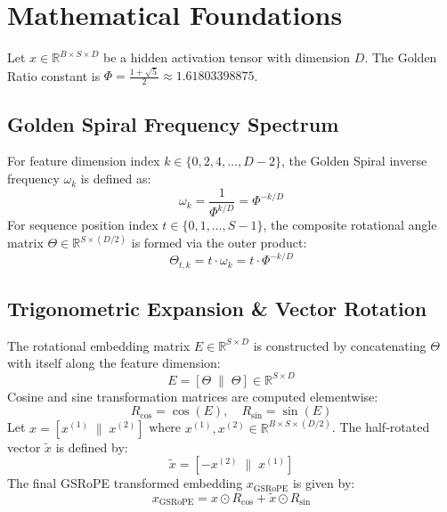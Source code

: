 \section{Mathematical Foundations}
Let $x \in \mathbb{R}^{B \times S \times D}$ be a hidden activation tensor with dimension $D$. The Golden Ratio constant is $\Phi = \frac{1+\sqrt{5}}{2} \approx 1.61803398875$.

\subsection{Golden Spiral Frequency Spectrum}
For feature dimension index $k \in \{0, 2, 4, \dots, D-2\}$, the Golden Spiral inverse frequency $\omega_k$ is defined as:
\begin{equation}
    \omega_k = \frac{1}{\Phi^{k / D}} = \Phi^{-k / D}
\end{equation}
For sequence position index $t \in \{0, 1, \dots, S-1\}$, the composite rotational angle matrix $\Theta \in \mathbb{R}^{S \times (D/2)}$ is formed via the outer product:
\begin{equation}
    \Theta_{t, k} = t \cdot \omega_k = t \cdot \Phi^{-k / D}
\end{equation}

\subsection{Trigonometric Expansion \& Vector Rotation}
The rotational embedding matrix $E \in \mathbb{R}^{S \times D}$ is constructed by concatenating $\Theta$ with itself along the feature dimension:
\begin{equation}
    E = [\Theta \;\|\; \Theta] \in \mathbb{R}^{S \times D}
\end{equation}
Cosine and sine transformation matrices are computed elementwise:
\begin{equation}
    R_{\text{cos}} = \cos(E), \quad R_{\text{sin}} = \sin(E)
\end{equation}
Let $x = [x^{(1)} \;\|\; x^{(2)}]$ where $x^{(1)}, x^{(2)} \in \mathbb{R}^{B \times S \times (D/2)}$. The half-rotated vector $\tilde{x}$ is defined by:
\begin{equation}
    \tilde{x} = [-x^{(2)} \;\|\; x^{(1)}]
\end{equation}
The final GSRoPE transformed embedding $x_{\text{GSRoPE}}$ is given by:
\begin{equation}
    x_{\text{GSRoPE}} = x \odot R_{\text{cos}} + \tilde{x} \odot R_{\text{sin}}
\end{equation}